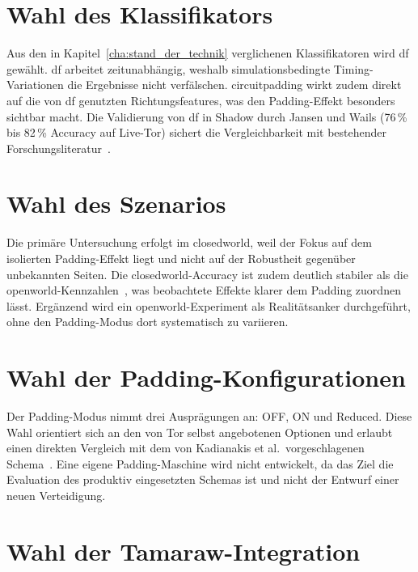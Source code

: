 \section{Wahl des Klassifikators}
\label{sec:konzepte_klassifikator}

Aus den in Kapitel~\ref{cha:stand_der_technik} verglichenen Klassifikatoren wird \gls{df} gewählt.
\gls{df} arbeitet zeitunabhängig, weshalb simulationsbedingte Timing-Variationen die Ergebnisse nicht verfälschen.
\gls{circuitpadding} wirkt zudem direkt auf die von \gls{df} genutzten Richtungsfeatures, was den Padding-Effekt besonders sichtbar macht.
Die Validierung von \gls{df} in Shadow durch Jansen und Wails (76\,\% bis 82\,\% Accuracy auf Live-Tor) sichert die Vergleichbarkeit mit bestehender Forschungsliteratur~\cite{jansen2023data}.

\section{Wahl des Szenarios}
\label{sec:konzepte_szenario}

Die primäre Untersuchung erfolgt im \gls{closedworld}, weil der Fokus auf dem isolierten Padding-Effekt liegt und nicht auf der Robustheit gegenüber unbekannten Seiten.
Die \gls{closedworld}-Accuracy ist zudem deutlich stabiler als die \gls{openworld}-Kennzahlen~\cite{jansen2023data}, was beobachtete Effekte klarer dem Padding zuordnen lässt.
Ergänzend wird ein \gls{openworld}-Experiment als Realitätsanker durchgeführt, ohne den Padding-Modus dort systematisch zu variieren.

\section{Wahl der Padding-Konfigurationen}
\label{sec:konzepte_padding_modi}

Der Padding-Modus nimmt drei Ausprägungen an: OFF, ON und Reduced.
Diese Wahl orientiert sich an den von Tor selbst angebotenen Optionen und erlaubt einen direkten Vergleich mit dem von Kadianakis et al.\ vorgeschlagenen Schema~\cite{kadianakis2021tor}.
Eine eigene Padding-Maschine wird nicht entwickelt, da das Ziel die Evaluation des produktiv eingesetzten Schemas ist und nicht der Entwurf einer neuen Verteidigung.

\section{Wahl der Tamaraw-Integration}
\label{sec:konzepte_tamaraw_integration}

